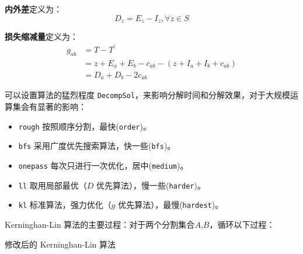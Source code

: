 \documentclass[a4paper,12pt]{article}
\begin{document}
\begin{CJK}{UTF8}{song}
\textbf{内外差}定义为：
\begin{equation}
    D_z = E_z - I_z, \forall z \in S
\end{equation}

\textbf{损失缩减量}定义为：
\begin{align}
    g_{ab} &= T - T^\prime \nonumber\\
    &= z + E_a + E_b - c_{ab} - (z + I_a + I_b + c_{ab}) \nonumber\\
    &= D_a + D_b - 2c_{ab} 
\end{align}

可以设置算法的猛烈程度
\texttt{DecompSol}，来影响分解时间和分解效果，对于大规模运算集会有显著的影响：

\begin{itemize}
\item
  \texttt{rough} 按照顺序分割，最快(\texttt{order})。
\item
  \texttt{bfs} 采用广度优先搜索算法，快一些(\texttt{bfs})。
\item
  \texttt{onepass} 每次只进行一次优化，居中(\texttt{medium})。
\item
  \texttt{ll} 取用局部最优（$D$ 优先算法），慢一些(\texttt{harder})。
\item
  \texttt{kl} 标准算法，强力优化（$g$ 优先算法），最慢(\texttt{hardest})。
\end{itemize}

Kerninghan-Lin 算法的主要过程：对于两个分割集合$A$,$B$，循环以下过程：

\begin{algorithm}[H]
    \BlankLine
    \caption{修改后的 Kerninghan-Lin 算法} \label{Alg-KL}
\end{algorithm}


\end{CJK}
\end{document}
